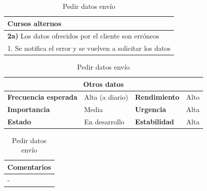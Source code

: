 \documentclass[12pt,spanish]{article}
\begin{document}
\begin{table}[H]
\vspace{1cm}

\begin{tabular}{|m{10pt}|m{7.15cm}|m{10pt}|m{7.15cm}|}
\hline
\multicolumn{4}{|m{16.2cm}|}{\textbf{Cursos alternos}} \\
\hline
\multicolumn{4}{|m{16.2cm}|}{\textbf{2a)} Los datos ofrecidos por el cliente son erróneos} \\
\hline
\multicolumn{4}{|m{16.2cm}|}{1. Se notifica el error y se vuelven a solicitar los datos}\\
\hline
\end{tabular}

\vspace{1cm}

\begin{tabular}{|m{3.72cm}|m{3.72cm}|m{3.72cm}|m{3.72cm}|}
\hline
\multicolumn{4}{|c|}{\textbf{Otros datos}} \\
\hline
\textbf{Frecuencia esperada} & Alta (a diario) & \textbf{Rendimiento} & Alto \\
\hline
\textbf{Importancia} & Media & \textbf{Urgencia} & Alta \\
\hline
\textbf{Estado} & En desarrollo & \textbf{Estabilidad} & Alta \\
\hline
\end{tabular}

\vspace{1cm}

\begin{tabular}{|m{16.2cm}|}
\hline
\textbf{Comentarios} \\
\hline
- \\
\hline
\end{tabular}

\caption{Pedir datos envío}

\end{table}


\end{document}

